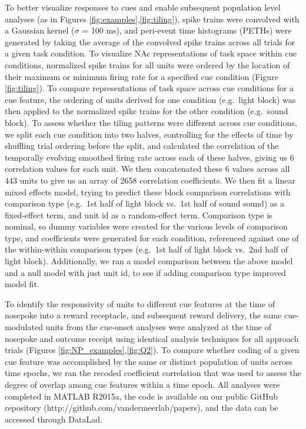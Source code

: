 \documentclass[11pt]{article}
\begin{document}
To better visualize responses to cues and enable subsequent population level analyses (as in Figures \ref{fig:examples},\ref{fig:tiling}), spike trains were convolved with a Gaussian kernel ($\sigma$ = 100 ms), and peri-event time histograms (PETHs) were generated by taking the average of the convolved spike trains across all trials for a given task condition. To visualize NAc representations of task space within cue conditions, normalized spike trains for all units were ordered by the location of their maximum or minimum firing rate for a specified cue condition (Figure \ref{fig:tiling}). To compare representations of task space across cue conditions for a cue feature, the ordering of units derived for one condition (e.g.\ light block) was then applied to the normalized spike trains for the other condition (e.g.\ sound block). To assess whether the tiling patterns were different across cue conditions, we split each cue condition into two halves, controlling for the effects of time by shuffling trial ordering before the split, and calculated the correlation of the temporally evolving smoothed firing rate across each of these halves, giving us 6 correlation values for each unit. We then concatenated these 6 values across all 443 units to give us an array of 2658 correlation coefficients. We then fit a linear mixed effects model, trying to predict these block comparison correlations with comparison type (e.g.\ 1st half of light block vs.\ 1st half of sound sound) as a fixed-effect term, and unit id as a random-effect term. Comparison type is nominal, so dummy variables were created for the various levels of comparison type, and coefficients were generated for each condition, referenced against one of the within-within comparison types (e.g.\ 1st half of light block vs.\ 2nd half of light block). Additionally, we ran a model comparison between the above model and a null model with just unit id, to see if adding comparison type improved model fit.

To identify the responsivity of units to different cue features at the time of nosepoke into a reward receptacle, and subsequent reward delivery, the same cue-modulated units from the cue-onset analyses were analyzed at the time of nosepoke and outcome receipt using identical analysis techniques for all approach trials (Figures \ref{fig:NP_examples},\ref{fig:Q2}). To compare whether coding of a given cue feature was accomplished by the same or distinct population of units across time epochs, we ran the recoded coefficient correlation that was used to assess the degree of overlap among cue features within a time epoch. All analyses were completed in MATLAB R2015a, the code is available on our public GitHub repository (http://github.com/vandermeerlab/papers), and the data can be accessed through DataLad.
\end{document}
